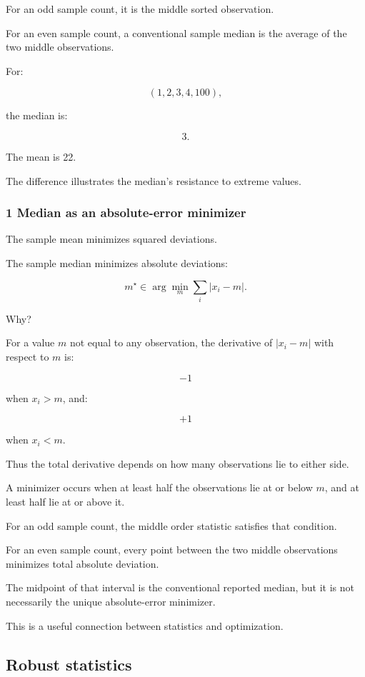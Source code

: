 For an odd sample count, it is the middle sorted observation.

For an even sample count, a conventional sample median is the average of the two middle observations.

For:

\[
 (1,2,3,4,100),
\]

the median is:

\[
 \boxed{3}.
\]

The mean is 22.

The difference illustrates the median's resistance to extreme values.

\subsubsection{1 Median as an absolute-error minimizer}\label{02-foundations-ii-ch030-median-as-an-absolute-error-minimizer}

The sample mean minimizes squared deviations.

The sample median minimizes absolute deviations:

\[
 \boxed{ m^\star\in \arg\min_m\sum_i|x_i-m| }.
\]

Why?

For a value \(m\) not equal to any observation, the derivative of \(|x_i-m|\) with respect to \(m\) is:

\[
 -1
\]

when \(x_i>m\), and:

\[
 +1
\]

when \(x_i<m\).

Thus the total derivative depends on how many observations lie to either side.

A minimizer occurs when at least half the observations lie at or below \(m\), and at least half lie at or above it.

For an odd sample count, the middle order statistic satisfies that condition.

For an even sample count, every point between the two middle observations minimizes total absolute deviation.

The midpoint of that interval is the conventional reported median, but it is not necessarily the unique absolute-error minimizer.

This is a useful connection between statistics and optimization.

\subsection{Robust statistics}\label{02-foundations-ii-ch030-robust-statistics}

